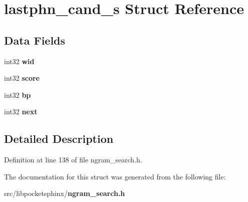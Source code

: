 \section{lastphn\-\_\-cand\-\_\-s Struct Reference}
\label{structlastphn__cand__s}
\subsection*{Data Fields}
\begin{DoxyCompactItemize}
\item 
int32 {\bfseries wid}\label{structlastphn__cand__s_af8f9fa3e4b6b7e2295d7a437b6f754c3}

\item 
int32 {\bfseries score}\label{structlastphn__cand__s_af862094c7b2476c6a66dbc120b19775b}

\item 
int32 {\bfseries bp}\label{structlastphn__cand__s_aa1aeb014f9023a75c81813376115fbcc}

\item 
int32 {\bfseries next}\label{structlastphn__cand__s_a06dade75d757f45e5d43b4869d85bac9}

\end{DoxyCompactItemize}


\subsection{Detailed Description}


Definition at line 138 of file ngram\-\_\-search.\-h.



The documentation for this struct was generated from the following file\-:\begin{DoxyCompactItemize}
\item 
src/libpocketsphinx/{\bf ngram\-\_\-search.\-h}\end{DoxyCompactItemize}
